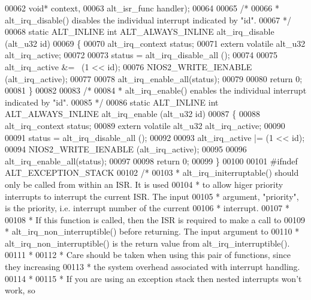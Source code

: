 \begin{DoxyCode}
00062                              \textcolor{keywordtype}{void}*   context, 
00063                              alt_isr_func handler);
00064 
00065 \textcolor{comment}{/*}
00066 \textcolor{comment}{ * alt\_irq\_disable() disables the individual interrupt indicated by "id".}
00067 \textcolor{comment}{ */}
00068 \textcolor{keyword}{static} ALT_INLINE \textcolor{keywordtype}{int} ALT_ALWAYS_INLINE alt_irq_disable (alt_u32 \textcolor{keywordtype}{id})
00069 \{
00070   alt_irq_context  status;
00071   \textcolor{keyword}{extern} \textcolor{keyword}{volatile} alt_u32 alt_irq_active;
00072 
00073   status = alt_irq_disable_all ();
00074 
00075   alt\_irq\_active &= ~(1 << id);
00076   NIOS2_WRITE_IENABLE (alt\_irq\_active);
00077 
00078   alt_irq_enable_all(status);
00079 
00080   \textcolor{keywordflow}{return} 0;
00081 \}
00082 
00083 \textcolor{comment}{/*}
00084 \textcolor{comment}{ * alt\_irq\_enable() enables the individual interrupt indicated by "id".}
00085 \textcolor{comment}{ */}
00086 \textcolor{keyword}{static} ALT_INLINE \textcolor{keywordtype}{int} ALT_ALWAYS_INLINE alt_irq_enable (alt_u32 \textcolor{keywordtype}{id})
00087 \{
00088   alt_irq_context  status;
00089   \textcolor{keyword}{extern} \textcolor{keyword}{volatile} alt_u32 alt_irq_active;
00090 
00091   status = alt_irq_disable_all ();
00092 
00093   alt\_irq\_active |= (1 << id);
00094   NIOS2_WRITE_IENABLE (alt\_irq\_active);
00095 
00096   alt_irq_enable_all(status);
00097 
00098   \textcolor{keywordflow}{return} 0;
00099 \}
00100 
00101 \textcolor{preprocessor}{#ifndef ALT\_EXCEPTION\_STACK}
00102 \textcolor{comment}{/*}
00103 \textcolor{comment}{ * alt\_irq\_initerruptable() should only be called from within an ISR. It is used}
00104 \textcolor{comment}{ * to allow higer priority interrupts to interrupt the current ISR. The input}
00105 \textcolor{comment}{ * argument, "priority", is the priority, i.e. interrupt number of the current}
00106 \textcolor{comment}{ * interrupt.}
00107 \textcolor{comment}{ *}
00108 \textcolor{comment}{ * If this function is called, then the ISR is required to make a call to}
00109 \textcolor{comment}{ * alt\_irq\_non\_interruptible() before returning. The input argument to}
00110 \textcolor{comment}{ * alt\_irq\_non\_interruptible() is the return value from alt\_irq\_interruptible().}
00111 \textcolor{comment}{ *}
00112 \textcolor{comment}{ * Care should be taken when using this pair of functions, since they increasing}
00113 \textcolor{comment}{ * the system overhead associated with interrupt handling.}
00114 \textcolor{comment}{ *}
00115 \textcolor{comment}{ * If you are using an exception stack then nested interrupts won't work, so}

\end{DoxyCode}
